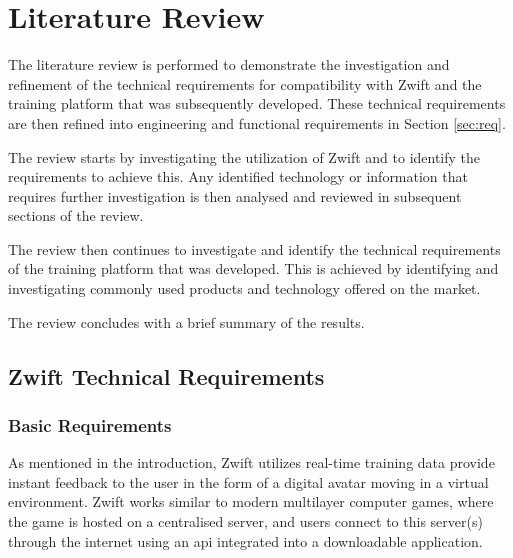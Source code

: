 
\chapter{Literature Review}
\label{sec:lit}


The literature review is performed to demonstrate the investigation and refinement of the technical requirements for compatibility with Zwift and the training platform that was subsequently developed. These technical requirements are then refined into engineering and functional requirements in Section \ref{sec:req}.

The review starts by investigating the utilization of Zwift and to identify the requirements to achieve this. Any identified technology or information that requires further investigation is then analysed and reviewed in subsequent sections of the review.

The review then continues to investigate and identify the technical requirements of the training platform that was developed. This is achieved by identifying and investigating commonly used products and technology offered on the market.

The review concludes with a brief summary of the results.

\newpage

\section{Zwift Technical Requirements}

\subsection{Basic Requirements}
As mentioned in the introduction, Zwift utilizes real-time training data provide instant feedback to the user in the form of a digital avatar moving in a virtual environment. Zwift works similar to modern multilayer computer games, where the game is hosted on a centralised server, and users connect to this server(s) through the internet using an \ac{api} integrated into a downloadable application.

